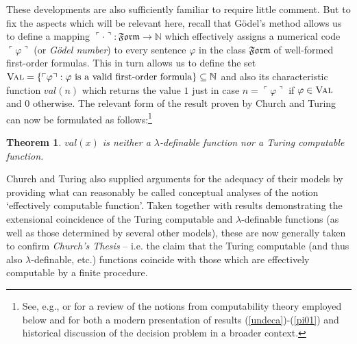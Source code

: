 \documentclass[11pt,fleqn,leqno]{article}
\newtheorem{theorem}{Theorem}[section]
\def\phi{\varphi}
\begin{document}
These developments are also sufficiently familiar to require little comment.  But to fix the aspects which will be relevant here, recall that G\"odel's method allows us to define a mapping $\ulcorner \cdot \urcorner : \mathfrak{Form} \rightarrow \mathbb{N}$ which effectively assigns a numerical code $\ulcorner \phi \urcorner$ (or \textsl{G\"odel number}) to every sentence $\phi$ in the class $\mathfrak{Form}$ of well-formed first-order formulas.  This in turn allows us to define the set $\textsc{Val} = \{\ulcorner \phi \urcorner : \phi \text{ is a valid first-order formula}\} \subseteq \mathbb{N}$ and also its characteristic function $\mathit{val}(n)$ which returns the value $1$ just in case $n = \ulcorner \phi \urcorner$ if $\phi \in \textsc{Val}$ and $0$ otherwise.   The relevant form of the result proven by Church and Turing can now be formulated as follows:\footnote{See, e.g., \citep{Soare2016} or \citep{Dean2020a} for a review of  the notions from computability theory employed below and \citep{Borger2001} for both a modern presentation of results (\ref{undeca})-(\ref{pi01}) and historical discussion of the decision problem in a broader context.}   
\begin{theorem} \label{undec} $\mathit{val}(x)$ is neither a $\lambda$-definable function nor a Turing computable function. 
\end{theorem}
\noindent Church and Turing also supplied arguments for the adequacy of their models by providing what can reasonably be called conceptual analyses of the notion `effectively computable function'.  Taken together with results demonstrating the extensional coincidence of the Turing computable and $\lambda$-definable functions (as well as those determined by several other models), these are now generally taken to confirm \textsl{Church's Thesis} -- i.e. the claim that the Turing computable (and thus also $\lambda$-definable, etc.) functions coincide with those which are effectively computable by a finite procedure.
\end{document}

